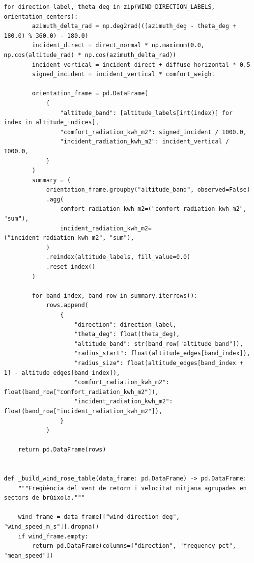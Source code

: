 \documentclass[10pt,a4paper]{article}
\begin{document}
\begin{lstlisting}[style=studioPython,caption={backend/visor\_epw\_backend.py},label={lst:backend-visor-epw-backend-py}]
    for direction_label, theta_deg in zip(WIND_DIRECTION_LABELS, orientation_centers):
        azimuth_delta_rad = np.deg2rad(((azimuth_deg - theta_deg + 180.0) % 360.0) - 180.0)
        incident_direct = direct_normal * np.maximum(0.0, np.cos(altitude_rad) * np.cos(azimuth_delta_rad))
        incident_vertical = incident_direct + diffuse_horizontal * 0.5
        signed_incident = incident_vertical * comfort_weight

        orientation_frame = pd.DataFrame(
            {
                "altitude_band": [altitude_labels[int(index)] for index in altitude_indices],
                "comfort_radiation_kwh_m2": signed_incident / 1000.0,
                "incident_radiation_kwh_m2": incident_vertical / 1000.0,
            }
        )
        summary = (
            orientation_frame.groupby("altitude_band", observed=False)
            .agg(
                comfort_radiation_kwh_m2=("comfort_radiation_kwh_m2", "sum"),
                incident_radiation_kwh_m2=("incident_radiation_kwh_m2", "sum"),
            )
            .reindex(altitude_labels, fill_value=0.0)
            .reset_index()
        )

        for band_index, band_row in summary.iterrows():
            rows.append(
                {
                    "direction": direction_label,
                    "theta_deg": float(theta_deg),
                    "altitude_band": str(band_row["altitude_band"]),
                    "radius_start": float(altitude_edges[band_index]),
                    "radius_size": float(altitude_edges[band_index + 1] - altitude_edges[band_index]),
                    "comfort_radiation_kwh_m2": float(band_row["comfort_radiation_kwh_m2"]),
                    "incident_radiation_kwh_m2": float(band_row["incident_radiation_kwh_m2"]),
                }
            )

    return pd.DataFrame(rows)


def _build_wind_rose_table(data_frame: pd.DataFrame) -> pd.DataFrame:
    """Freqüència del vent de retorn i velocitat mitjana agrupades en sectors de brúixola."""

    wind_frame = data_frame[["wind_direction_deg", "wind_speed_m_s"]].dropna()
    if wind_frame.empty:
        return pd.DataFrame(columns=["direction", "frequency_pct", "mean_speed"])


\end{lstlisting}
\end{document}
